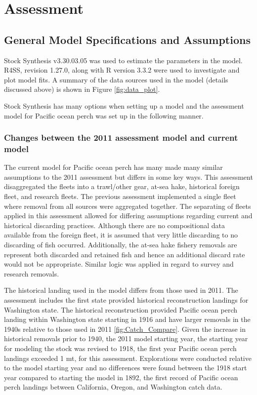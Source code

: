 \documentclass[12pt,]{article}
\begin{document}
\section{Assessment}\label{assessment}

\subsection{General Model Specifications and
Assumptions}\label{general-model-specifications-and-assumptions}

Stock Synthesis v3.30.03.05 was used to estimate the parameters in the
model. R4SS, revision 1.27.0, along with R version 3.3.2 were used to
investigate and plot model fits. A summary of the data sources used in
the model (details discussed above) is shown in Figure
\ref{fig:data_plot}.

Stock Synthesis has many options when setting up a model and the
assessment model for Pacific ocean perch was set up in the following
manner.

\subsubsection{Changes between the 2011 assessment model and current
model}\label{changes-between-the-2011-assessment-model-and-current-model}

The current model for Pacific ocean perch has many made many similar
assumptions to the 2011 assessment but differs in some key ways. This
assessment disaggregated the fleets into a trawl/other gear, at-sea
hake, historical foreign fleet, and research fleets. The previous
assessment implemented a single fleet where removal from all sources
were aggregated together. The separating of fleets applied in this
assessment allowed for differing assumptions regarding current and
historical discarding practices. Although there are no compositional
data available from the foreign fleet, it is assumed that very little
discarding to no discarding of fish occurred. Additionally, the at-sea
hake fishery removals are represent both discarded and retained fish and
hence an additional discard rate would not be appropriate. Similar logic
was applied in regard to survey and research removals.

The historical landing used in the model differs from those used in
2011. The assessment includes the first state provided historical
reconstruction landings for Washington state. The historical
reconstruction provided Pacific ocean perch landing within Washington
state starting in 1916 and have larger removals in the 1940s relative to
those used in 2011 \ref{fig:Catch_Compare}. Given the increase in
historical removals prior to 1940, the 2011 model starting year, the
starting year for modeling the stock was revised to 1918, the first year
Pacific ocean perch landings exceeded 1 mt, for this assessment.
Explorations were conducted relative to the model starting year and no
differences were found between the 1918 start year compared to starting
the model in 1892, the first record of Pacific ocean perch landings
between California, Oregon, and Washington catch data.
\end{document}
